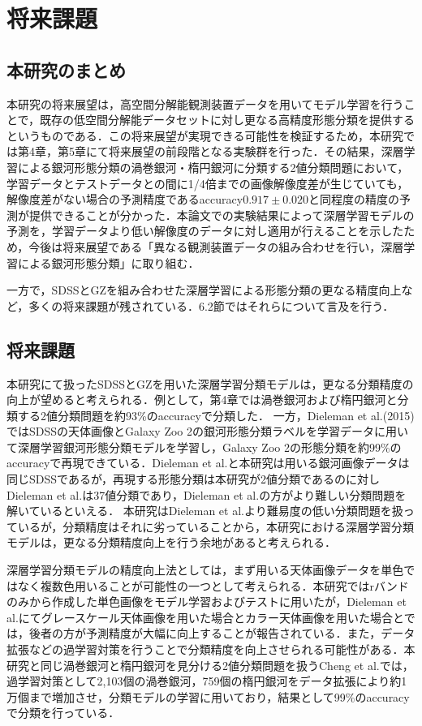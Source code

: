 \documentclass[a4j, 11pt]{jreport}
\begin{document}
\newpage
\chapter{将来課題}
\section{本研究のまとめ}
本研究の将来展望は，高空間分解能観測装置データを用いてモデル学習を行うことで，既存の低空間分解能データセットに対し更なる高精度形態分類を提供するというものである．この将来展望が実現できる可能性を検証するため，本研究では第4章，第5章にて将来展望の前段階となる実験群を行った．その結果，深層学習による銀河形態分類の渦巻銀河・楕円銀河に分類する2値分類問題において，学習データとテストデータとの間に1/4倍までの画像解像度差が生じていても，解像度差がない場合の予測精度であるaccuracy$0.917 \pm 0.020$と同程度の精度の予測が提供できることが分かった．本論文での実験結果によって深層学習モデルの予測を，学習データより低い解像度のデータに対し適用が行えることを示したため，今後は将来展望である「異なる観測装置データの組み合わせを行い，深層学習による銀河形態分類」に取り組む．

一方で，SDSSとGZを組み合わせた深層学習による形態分類の更なる精度向上など，多くの将来課題が残されている．6.2節ではそれらについて言及を行う．

\section{将来課題}
本研究にて扱ったSDSSとGZを用いた深層学習分類モデルは，更なる分類精度の向上が望めると考えられる．例として，第4章では渦巻銀河および楕円銀河と分類する2値分類問題を約93\%のaccuracyで分類した．
一方，Dieleman et al.(2015)\cite{Dieleman2015}ではSDSSの天体画像とGalaxy Zoo 2の銀河形態分類ラベルを学習データに用いて深層学習銀河形態分類モデルを学習し，Galaxy Zoo 2の形態分類を約99\%のaccuracyで再現できている．Dieleman et al.と本研究は用いる銀河画像データは同じSDSSであるが，再現する形態分類は本研究が2値分類であるのに対しDieleman et al.は37値分類であり，Dieleman et al.の方がより難しい分類問題を解いているといえる．
本研究はDieleman et al.より難易度の低い分類問題を扱っているが，分類精度はそれに劣っていることから，本研究における深層学習分類モデルは，更なる分類精度向上を行う余地があると考えられる．

深層学習分類モデルの精度向上法としては，まず用いる天体画像データを単色ではなく複数色用いることが可能性の一つとして考えられる．本研究ではrバンドのみから作成した単色画像をモデル学習およびテストに用いたが，Dieleman et al.にてグレースケール天体画像を用いた場合とカラー天体画像を用いた場合とでは，後者の方が予測精度が大幅に向上することが報告されている．また，データ拡張などの過学習対策を行うことで分類精度を向上させられる可能性がある．本研究と同じ渦巻銀河と楕円銀河を見分ける2値分類問題を扱うCheng et al.では，過学習対策として2,103個の渦巻銀河，759個の楕円銀河をデータ拡張により約1万個まで増加させ，分類モデルの学習に用いており，結果として99\%のaccuracyで分類を行っている．
\end{document}
